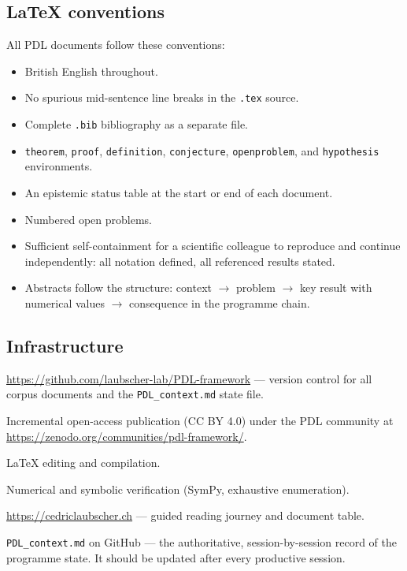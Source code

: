 \documentclass[11pt,a4paper]{article}
\theoremstyle{plain}
\theoremstyle{definition}
\theoremstyle{remark}
\begin{document}
\subsection{LaTeX conventions}
\label{subsec:latex}

All PDL documents follow these conventions:
\begin{itemize}
\item British English throughout.
\item No spurious mid-sentence line breaks in the \texttt{.tex} source.
\item Complete \texttt{.bib} bibliography as a separate file.
\item \texttt{theorem}, \texttt{proof}, \texttt{definition}, \texttt{conjecture}, \texttt{openproblem}, and \texttt{hypothesis} environments.
\item An epistemic status table at the start or end of each document.
\item Numbered open problems.
\item Sufficient self-containment for a scientific colleague to reproduce and continue independently: all notation defined, all referenced results stated.
\item Abstracts follow the structure: context $\to$ problem $\to$ key result with numerical values $\to$ consequence in the programme chain.
\end{itemize}

\subsection{Infrastructure}
\label{subsec:infra}

\begin{description}[leftmargin=2.5cm,style=nextline]
\item[GitHub] \url{https://github.com/laubscher-lab/PDL-framework} — version control for all corpus documents and the \texttt{PDL\_context.md} state file.
\item[Zenodo] Incremental open-access publication (CC BY 4.0) under the PDL community at \url{https://zenodo.org/communities/pdl-framework/}.
\item[Overleaf] LaTeX editing and compilation.
\item[Google Colab] Numerical and symbolic verification (SymPy, exhaustive enumeration).
\item[Website] \url{https://cedriclaubscher.ch} — guided reading journey and document table.
\item[State file] \texttt{PDL\_context.md} on GitHub — the authoritative, session-by-session record of the programme state. It should be updated after every productive session.
\end{description}
\end{document}
